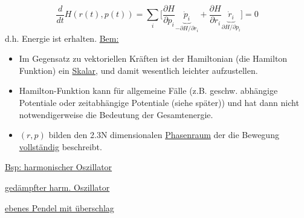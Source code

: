 \documentclass[titlepage,12pt,a4paper,ngerman]{report}
\begin{document}
{$$\frac{d}{dt} H(r(t),p(t)) = \sum_i \bigg[ \frac{\partial H}{\partial p_i} \underbrace{\dot{p}_i}_{ -\partial H / \partial r_i} + \frac{\partial H}{\partial r_i} \underbrace{\dot{r}_i}_{\partial H / \partial p_i} \bigg] = 0$$
d.h. Energie ist erhalten.
\underline{Bem:}
\begin{itemize}
	\item Im Gegensatz zu vektoriellen Kräften ist der Hamiltonian (die Hamilton Funktion) ein \underline{Skalar}, und damit wesentlich leichter aufzustellen.
	\item Hamilton-Funktion kann für allgemeine Fälle (z.B. geschw. abhängige Potentiale oder zeitabhängige Potentiale (siehe später)) und hat dann nicht notwendigerweise die Bedeutung der Gesamtenergie.
	\item $(r,p)$ bilden den 2.3N dimensionalen \underline{Phasenraum} der die Bewegung \underline{vollständig} beschreibt.
\end{itemize}

\underline{Bsp: harmonischer Oszillator}


\underline{gedämpfter harm. Oszillator}


\underline{ebenes Pendel mit überschlag}


}
\end{document}
